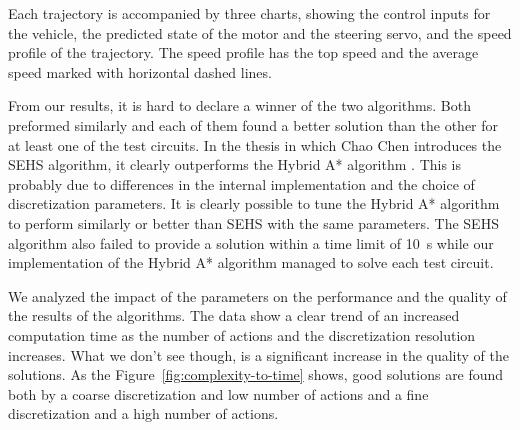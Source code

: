 Each trajectory is accompanied by three charts, showing the control inputs for the vehicle, the predicted state of the motor and the steering servo, and the speed profile of the trajectory. The speed profile has the top speed and the average speed marked with horizontal dashed lines.

From our results, it is hard to declare a winner of the two algorithms. Both preformed similarly and each of them found a better solution than the other for at least one of the test circuits. In the thesis in which Chao Chen introduces the \gls{SEHS} algorithm, it clearly outperforms the Hybrid A* algorithm \cite{SEHS}. This is probably due to differences in the internal implementation and the choice of discretization parameters. It is clearly possible to tune the Hybrid A* algorithm to perform similarly or better than \gls*{SEHS} with the same parameters. The \gls*{SEHS} algorithm also failed to provide a solution within a time limit of \SI{10}{\second} while our implementation of the Hybrid A* algorithm managed to solve each test circuit.

We analyzed the impact of the parameters on the performance and the quality of the results of the algorithms. The data show a clear trend of an increased computation time as the number of actions and the discretization resolution increases. What we don't see though, is a significant increase in the quality of the solutions. As the Figure~\ref{fig:complexity-to-time} shows, good solutions are found both by a coarse discretization and low number of actions and a fine discretization and a high number of actions.

